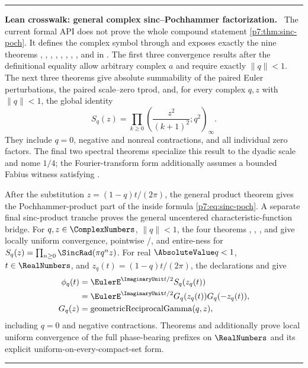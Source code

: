\documentclass[11pt,oneside]{article}
\numberwithin{equation}{section}
\theoremstyle{definition}
\theoremstyle{remark}
\newenvironment{statusbox}[1]{%
  \par\medskip\noindent\begin{center}\begin{minipage}{0.94\textwidth}%
  \color{linkblue}\hrule\vspace{0.65em}%
  \color{black}\textbf{\color{linkblue}#1.}\ }{%
  \par\vspace{0.65em}\color{linkblue}\hrule
  \end{minipage}\end{center}\medskip}
\begin{document}
\begin{statusbox}{Lean crosswalk: general complex sinc--Pochhammer factorization}
The current formal API does not prove the whole compound statement
\cref{p7:thm:sinc-poch}.  It defines the complex symbol through
 and exposes exactly the nine theorems
,
,
,
,
,
,
,
, and
 in
.  The first three convergence
results after the definitional equality allow arbitrary complex $a$ and
require exactly $\lVert q\rVert<1$.  The next three theorems give absolute
summability of the paired Euler perturbations, the paired scale--zero tprod,
and, for every complex $q,z$ with $\lVert q\rVert<1$, the global identity
\[
 S_q(z)=\prod_{k\ge0}
 \left(\frac{z^2}{(k+1)^2};q^2\right)_\infty .
\]
They include $q=0$, negative and nonreal contractions, and all individual
zero factors.  The final two spectral theorems specialize this result to the
dyadic scale and nome $1/4$; the Fourier-transform form additionally assumes
a bounded Fabius witness satisfying .

After the substitution $z=(1-q)t/(2\pi)$, the general product theorem gives
the Pochhammer-product part of the inside formula
\eqref{p7:eq:sinc-poch}.  A separate final sinc-product tranche proves the
general uncentered characteristic-function bridge.  For
$q,z\in\ComplexNumbers$, $\lVert q\rVert<1$, the four theorems
,
,
, and
 give locally uniform convergence,
pointwise /, and entire-ness for
$S_q(z)=\prod_{n\ge0}\SincRad(\pi q^nz)$.  For real $\AbsoluteValue q<1$, $t\in\RealNumbers$, and
$z_q(t)=(1-q)t/(2\pi)$, the declarations
and
give
\[
\begin{aligned}
 \phi_q(t)
   &=\EulerE^{\ImaginaryUnit t/2}S_q(z_q(t)) \\
   &=\EulerE^{\ImaginaryUnit t/2}G_q(z_q(t))G_q(-z_q(t)), \\
 G_q(z)&=\operatorname{geometricReciprocalGamma}(q,z),
\end{aligned}
\]
including $q=0$ and negative contractions.
Theorems  and
 additionally prove local
uniform convergence of the full phase-bearing prefixes on \(\RealNumbers\) and its
explicit uniform-on-every-compact-set form.


\end{statusbox}
\end{document}
